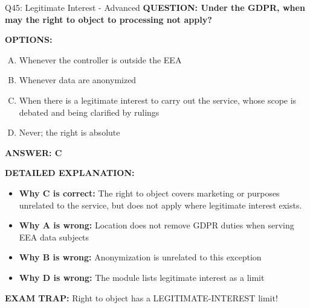 \documentclass[8pt]{beamer}
\begin{document}
\begin{frame}[shrink=6]{Q45: Legitimate Interest - Advanced}
\fontsize{6.5}{7.5}\selectfont
\textbf{QUESTION: Under the GDPR, when may the right to object to processing not apply?}

\vspace{0.1cm}
\textbf{OPTIONS:}
\begin{enumerate}[A.]
\item Whenever the controller is outside the EEA
\item Whenever data are anonymized
\item When there is a legitimate interest to carry out the service, whose scope is debated and being clarified by rulings
\item Never; the right is absolute
\end{enumerate}

\vspace{0.1cm}
\textcolor{myblue}{\textbf{ANSWER: C}}

\vspace{0.1cm}
\textbf{DETAILED EXPLANATION:}
\begin{itemize}
\item \textbf{Why C is correct:} The right to object covers marketing or purposes unrelated to the service, but does not apply where legitimate interest exists.
\item \textbf{Why A is wrong:} Location does not remove GDPR duties when serving EEA data subjects
\item \textbf{Why B is wrong:} Anonymization is unrelated to this exception
\item \textbf{Why D is wrong:} The module lists legitimate interest as a limit
\end{itemize}

\textcolor{myred}{\textbf{EXAM TRAP:}} Right to object has a LEGITIMATE-INTEREST limit!
\end{frame}
\end{document}
